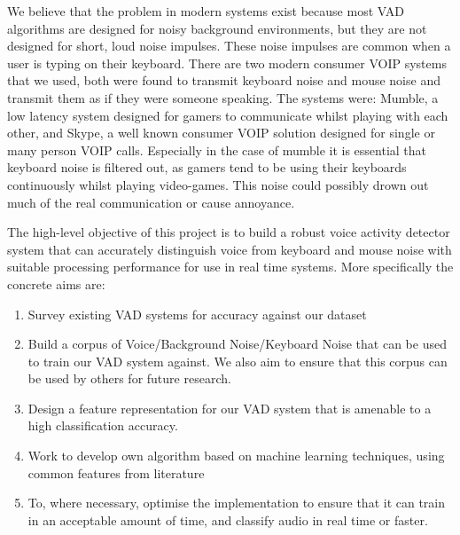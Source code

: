 \documentclass[ %
                    author={Sam Phippen},
                supervisor={Dr. Rafal Bogacz},
                     title={Real time voice activity detectors in noisy personal computing environments},
                  subtitle={},
                    degree={MEng},
                      year={2012} ]{thesis}
\begin{document}
We believe that the problem in modern systems exist because most VAD algorithms
are designed for noisy background environments\cite{shin}, but they are not
designed for short, loud noise impulses. These noise impulses are common when a
user is typing on their keyboard. There are two modern consumer VOIP systems
that we used, both were found to transmit keyboard noise and mouse noise and
transmit them as if they were someone speaking. The systems were:
Mumble\cite{mumble}, a low latency system designed for gamers to communicate
whilst playing with each other, and Skype\texttrademark\cite{skype}, a well
known consumer VOIP solution designed for single or many person VOIP calls.
Especially in the case of mumble it is essential that keyboard noise is
filtered out, as gamers tend to be using their keyboards continuously whilst
playing video-games. This noise could possibly drown out much of the real
communication or cause annoyance.

The high-level objective of this project is to build a robust voice activity
detector system that can accurately distinguish voice from keyboard and mouse
noise with suitable processing performance for use in real time systems. More
specifically the concrete aims are:

\begin{enumerate}

    \item Survey existing VAD systems for accuracy against our dataset

    \item Build a corpus of Voice/Background Noise/Keyboard Noise that can be
        used to train our VAD system against. We also aim to ensure that this
        corpus can be used by others for future research.

    \item Design a feature representation for our VAD system that is amenable
        to a high classification accuracy.

    \item Work to develop own algorithm based on machine learning techniques,
        using common features from literature

    \item To, where necessary, optimise the implementation to ensure that it
        can train in an acceptable amount of time, and classify audio in real
        time or faster.

\end{enumerate}
\end{document}
